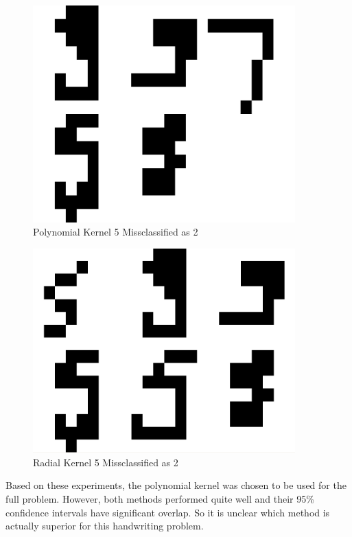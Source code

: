 \documentclass{article}
\begin{document}
\begin{figure}
\centering
\includegraphics[width=0.9\textwidth]{images/test2_5_correct5_class2_a0156.png}
\caption{Polynomial Kernel 5 Missclassified as 2}
\label{poly5errortest}
\end{figure}

\begin{figure}
\centering
\includegraphics[width=0.9\textwidth]{images/test2_5_correct5_class2_radial.png}
\caption{Radial Kernel 5 Missclassified as 2}
\label{radial5errortest}
\end{figure}

Based on these experiments, the polynomial kernel was chosen to be used for the full problem. However, both methods performed quite well and their 95\% confidence intervals have significant overlap. So it is unclear which method is actually superior for this handwriting problem.
\end{document}
